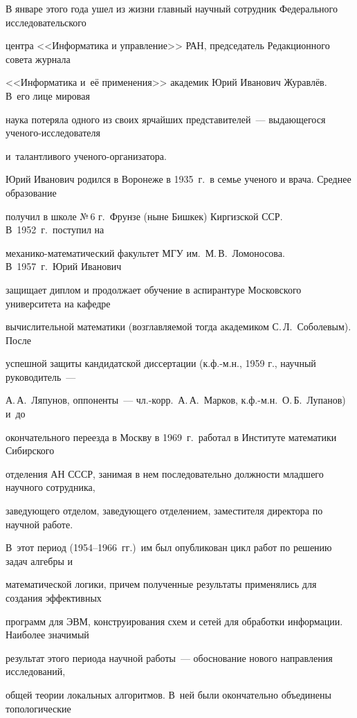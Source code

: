 В январе этого года ушел из жизни главный научный сотрудник Федерального исследовательского 


центра <<Информатика и управление>> РАН, председатель Редакционного совета журнала 


<<Информатика и~её применения>> академик Юрий Иванович Журавлёв. В~его лице мировая 


наука потеряла одного из своих ярчайших представителей~--- выдающегося ученого-исследователя 


и~талантливого ученого-организатора.





Юрий Иванович родился в Воронеже в 1935~г.\ в семье ученого и врача. Среднее образование 


получил в школе №\,6 г.~Фрунзе (ныне Бишкек) Киргизской ССР. В~1952~г.\ поступил на 


ме\-ха\-ни\-ко-ма\-те\-ма\-ти\-че\-ский факультет МГУ им.\ М.\,В.~Ломоносова. В~1957~г.\ Юрий Иванович 


защищает диплом и продолжает обучение в аспирантуре Московского университета на кафедре 


вычислительной математики (возглавляемой тогда академиком С.\,Л.~Соболевым). После 


успешной защиты кандидатской диссертации (к.ф.-м.н., 1959 г., научный руководитель~--- 


А.\,А.~Ляпунов, оппоненты~--- чл.-корр.\ А.\,А.~Марков, к.ф.-м.н.\ О.\,Б.~Лупанов) и~до 


окончательного переезда в Москву в 1969~г.\ работал в Институте математики Сибирского 


отделения АН СССР, занимая в нем последовательно должности младшего научного сотрудника, 


заведующего отделом, заведующего отделением, заместителя директора по научной работе. 


В~этот период (1954--1966~гг.)\ им был опубликован цикл работ по решению задач алгебры и 


математической логики, причем полученные результаты применялись для создания эффективных 


программ для ЭВМ, конструирования схем и сетей для обработки информации. Наиболее значимый 


результат этого периода научной работы~--- обоснование нового направления исследований, 


общей теории локальных алгоритмов. В~ней были окончательно объединены топологические 


